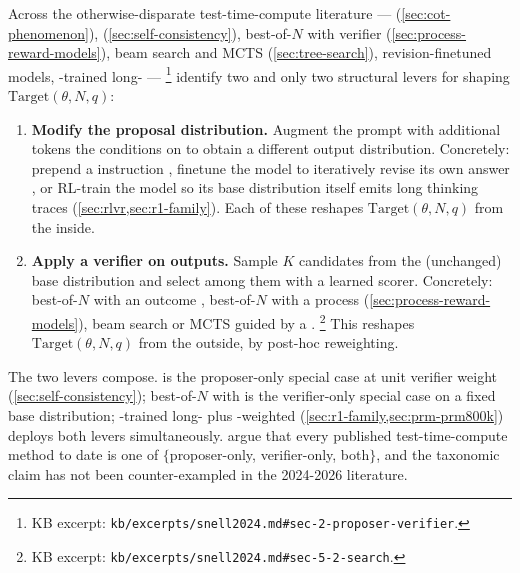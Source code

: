 Across the otherwise-disparate test-time-compute literature ---
\linebreak[0] (\cref{sec:cot-phenomenon}), 
(\cref{sec:self-consistency}), best-of-$N$ with verifier
(\cref{sec:process-reward-models}), beam search and MCTS
(\cref{sec:tree-search}), revision-finetuned models, -trained
long- --- \citet[\S 2]{snell2024}%
\footnote{KB excerpt: \nolinkurl{kb/excerpts/snell2024.md#sec-2-proposer-verifier}.}
identify two and only two structural levers for shaping
$\mathrm{Target}(\theta, N, q)$:
\begin{enumerate}
\item \textbf{Modify the proposal distribution.} Augment the prompt
with additional tokens the  conditions on to obtain a different
output distribution. Concretely: prepend a  instruction
\citep{wei2022-cot, kojima2022}, finetune the model to iteratively
revise its own answer \citep[\S 2]{snell2024}, or RL-train the model so
its base distribution itself emits long thinking traces
(\cref{sec:rlvr,sec:r1-family}). Each of these reshapes
$\mathrm{Target}(\theta, N, q)$ from the inside.
\item \textbf{Apply a verifier on outputs.} Sample $K$ candidates from
the (unchanged) base distribution and select among them with a learned
scorer. Concretely: best-of-$N$ with an outcome , best-of-$N$
with a process 
(\cref{sec:process-reward-models}), beam search or MCTS guided by a
 \citep[\S 5.2]{snell2024}.%
\footnote{KB excerpt: \nolinkurl{kb/excerpts/snell2024.md#sec-5-2-search}.}
This reshapes $\mathrm{Target}(\theta, N, q)$ from the outside, by
post-hoc reweighting.
\end{enumerate}

The two levers compose.  is the proposer-only special
case at unit verifier weight (\cref{sec:self-consistency}); best-of-$N$
with  is the verifier-only special case on a fixed base distribution;
-trained long- plus -weighted 
(\cref{sec:r1-family,sec:prm-prm800k}) deploys both levers
simultaneously. \citet[\S 2]{snell2024} argue that every published
test-time-compute method to date is one of $\{$proposer-only,
verifier-only, both$\}$, and the taxonomic claim has not been
counter-exampled in the 2024-2026 literature.

